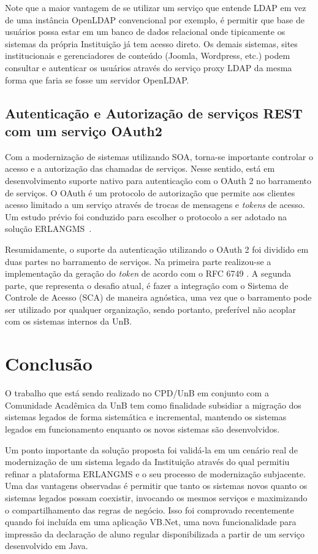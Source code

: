 \documentclass[12pt]{article}
\begin{document}
Note que a maior vantagem de se utilizar um serviço que entende LDAP
em vez de uma instância OpenLDAP convencional por exemplo, 
é permitir que base de usuários possa
estar em um banco de dados relacional onde tipicamente os sistemas da própria Instituição
já tem acesso direto. Os demais sistemas, sites institucionais 
e gerenciadores de conteúdo (Joomla, Wordpress, etc.)
podem consultar e autenticar os usuários através do serviço proxy LDAP 
da mesma forma que faria se fosse um servidor OpenLDAP.



\subsection{Autenticação e Autorização de serviços REST com um serviço OAuth2}\label{oauth2}

Com a modernização de sistemas utilizando SOA, torna-se
importante controlar o acesso e a autorização das chamadas de serviços.
Nesse sentido, está em desenvolvimento suporte nativo para autenticação com o OAuth 2 no barramento de serviços. 
O OAuth é um protocolo de autorização 
que permite aos clientes acesso limitado a um serviço através de trocas de 
mensagens e \textit{tokens} de acesso. Um estudo prévio foi conduzido para
escolher o protocolo a ser adotado
na solução ERLANGMS~\cite{7521451}.


Resumidamente, o suporte da autenticação utilizando o OAuth 2 foi dividido em duas partes no barramento de serviços.
Na primeira parte realizou-se a implementação
da geração do \textit{token} de acordo com o RFC 6749 \cite{hardt2012oauth}.
A segunda parte, que representa 
o desafio atual, é fazer a integração com o Sistema de Controle de Acesso (SCA)
de maneira agnóstica, uma vez que o barramento pode ser utilizado 
por qualquer organização, sendo portanto, preferível não acoplar com 
os sistemas internos da UnB.




\section{Conclusão}

O trabalho que está sendo realizado
no CPD/UnB em conjunto com a Comunidade Acadêmica da UnB
tem como finalidade subsidiar
a migração
dos sistemas legados de forma sistemática 
e incremental, mantendo os sistemas legados
em funcionamento enquanto os novos sistemas
são desenvolvidos.

Um ponto importante
da solução proposta foi validá-la em um cenário real de modernização de um sistema
legado da Instituição
através do qual permitiu refinar a plataforma ERLANGMS e o seu processo de modernização subjacente.
Uma das vantagens observadas é permitir que tanto 
os sistemas novos quanto os sistemas legados possam coexistir, 
invocando os mesmos serviços e
maximizando o compartilhamento das regras de negócio. Isso foi comprovado 
recentemente quando foi incluída em uma aplicação VB.Net, uma nova funcionalidade
para impressão da declaração de aluno regular disponibilizada a partir de um serviço desenvolvido em Java.




\end{document}
